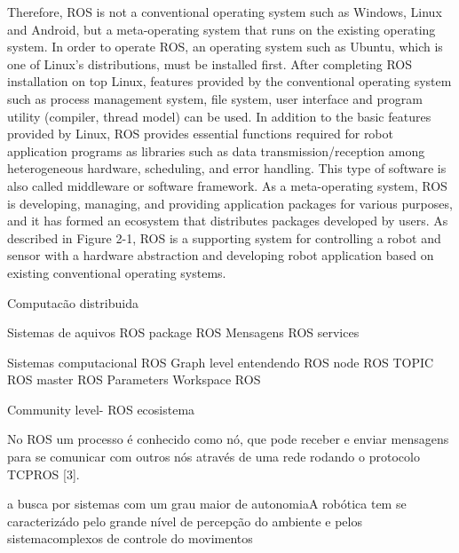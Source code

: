 Therefore, ROS is not a conventional operating system such as Windows, Linux and Android,
but a meta-operating system that runs on the existing operating system. In order to operate ROS,
an operating system such as Ubuntu, which is one of Linux’s distributions, must be installed
first. After completing ROS installation on top Linux, features provided by the conventional
operating system such as process management system, file system, user interface and program
utility (compiler, thread model) can be used. In addition to the basic features provided by Linux,
ROS provides essential functions required for robot application programs as libraries such as
data transmission/reception among heterogeneous hardware, scheduling, and error handling.
This type of software is also called middleware or software framework.
As a meta-operating system, ROS is developing, managing, and providing application
packages for various purposes, and it has formed an ecosystem that distributes packages
developed by users. As described in Figure 2-1, ROS is a supporting system for controlling a
robot and sensor with a hardware abstraction and developing robot application based on existing
conventional operating systems.


Computacão distribuida

Sistemas de aquivos
ROS package
ROS Mensagens
ROS services

Sistemas computacional ROS Graph level
entendendo ROS node
ROS TOPIC
ROS master
ROS Parameters
Workspace ROS


Community level- ROS ecosistema


















No ROS um processo é conhecido como nó, que pode receber e enviar mensagens para se comunicar com outros nós através de uma rede rodando o protocolo TCPROS [3].










a busca por sistemas com um grau maior de autonomiaA robótica tem se caracterizádo pelo grande nível de percepção do ambiente e pelos sistemacomplexos de controle do movimentos 

